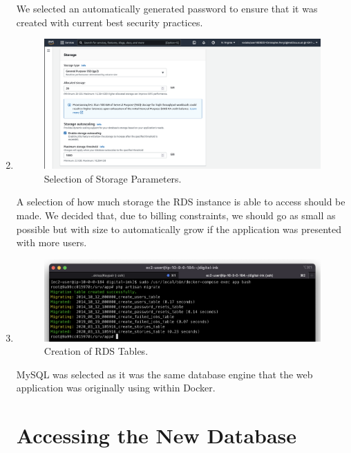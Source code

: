 \begin{enumerate}
    We selected an automatically generated password to ensure that it was created with current best security practices.

    \item
    \begin{figure}[H]
        \centering
        \includegraphics[width=\textwidth]{resources/rds/rds-storage}
        \caption{Selection of Storage Parameters.}
        \label{fig:rds-storage}
    \end{figure}

    A selection of how much storage the RDS instance is able to access should be made.
    We decided that, due to billing constraints, we should go as small as possible but with size to automatically grow if
    the application was presented with more users.

    \item
    \begin{figure}[H]
        \centering
        \includegraphics[width=\textwidth]{resources/rds/rds-tables-creation}
        \caption{Creation of RDS Tables.}
        \label{fig:rds-tables}
    \end{figure}




    MySQL was selected as it was the same database engine that the web application was originally using within Docker.

    \section{Accessing the New Database}


\end{enumerate}
